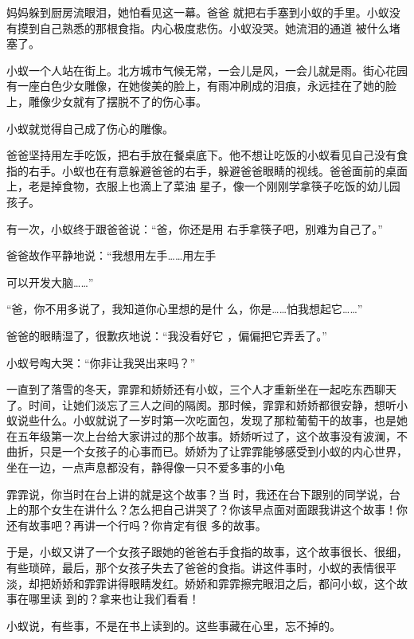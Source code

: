 \documentclass{article}
\begin{document}
妈妈躲到厨房流眼泪，她怕看见这一幕。爸爸
\newpage
就把右手塞到小蚁的手里。小蚁没有摸到自己熟悉的那根食指。内心极度悲伤。小蚁没哭。她流泪的通道
被什么堵塞了。 

小蚁一个人站在街上。北方城市气候无常，一会儿是风，一会儿就是雨。街心花园有一座白色少女雕像，在她俊美的脸上，有雨冲刷成的泪痕，永远挂在了她的脸上，雕像少女就有了摆脱不了的伤心事。


小蚁就觉得自己成了伤心的雕像。 

爸爸坚持用左手吃饭，把右手放在餐桌底下。他不想让吃饭的小蚁看见自己没有食指的右手。小蚁也在有意躲避爸爸的右手，躲避爸爸眼睛的视线。爸爸面前的桌面上，老是掉食物，衣服上也滴上了菜油
星子，像一个刚刚学拿筷子吃饭的幼儿园孩子。 

有一次，小蚁终于跟爸爸说：“爸，你还是用
右手拿筷子吧，别难为自己了。” 

爸爸故作平静地说：“我想用左手……用左手
\newpage

可以开发大脑……” 

“爸，你不用多说了，我知道你心里想的是什
么，你是……怕我想起它……” 

爸爸的眼睛湿了，很歉疚地说：“我没看好它
，偏偏把它弄丢了。” 


小蚁号啕大哭：“你非让我哭出来吗？” 

一直到了落雪的冬天，霏霏和娇娇还有小蚁，三个人才重新坐在一起吃东西聊天了。时间，让她们淡忘了三人之间的隔阂。那时候，霏霏和娇娇都很安静，想听小蚁说些什么。小蚁就说了一岁时第一次吃面包，发现了那粒葡萄干的故事，也是她在五年级第一次上台给大家讲过的那个故事。娇娇听过了，这个故事没有波澜，不曲折，只是一个女孩子的心事而已。娇娇为了让霏霏能够感受到小蚁的内心世界，坐在一边，一点声息都没有，静得像一只不爱多事的小龟

霏霏说，你当时在台上讲的就是这个故事？当
\newpage
时，我还在台下跟别的同学说，台上的那个女生在讲什么？怎么把自己讲哭了？你该早点面对面跟我讲这个故事！你还有故事吧？再讲一个行吗？你肯定有很
多的故事。 

于是，小蚁又讲了一个女孩子跟她的爸爸右手食指的故事，这个故事很长、很细，有些琐碎，最后，那个女孩子失去了爸爸的食指。讲这件事时，小蚁的表情很平淡，却把娇娇和霏霏讲得眼睛发红。娇娇和霏霏擦完眼泪之后，都问小蚁，这个故事在哪里读
到的？拿来也让我们看看！ 

小蚁说，有些事，不是在书上读到的。这些事藏在心里，忘不掉的。
\end{document}
